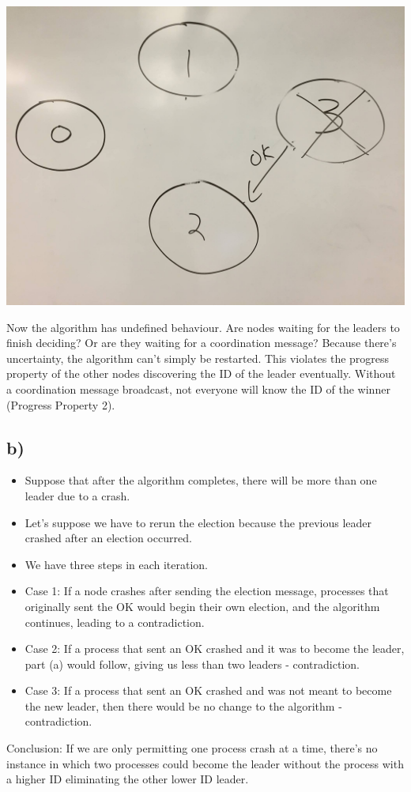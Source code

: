\documentclass[12pt]{article}
\begin{document}
\begin{center}
\includegraphics[scale=0.1]{nodes0}
\end{center}

Now the algorithm has undefined behaviour. Are nodes waiting for the leaders to finish deciding? Or are they waiting for a coordination message? Because there's uncertainty, the algorithm can't simply be restarted. This violates the progress property of the other nodes discovering the ID of the leader eventually. Without a coordination message broadcast, not everyone will know the ID of the winner (Progress Property 2).

\subsection*{b)}
\begin{itemize}
\item Suppose that after the algorithm completes, there will be more than one leader due to a crash.
\item Let's suppose we have to rerun the election because the previous leader crashed after an election occurred.
\item We have three steps in each iteration.
\item Case 1: If a node crashes after sending the election message, processes that originally sent the OK would begin their own election, and the algorithm continues, leading to a contradiction.
\item Case 2: If a process that sent an OK crashed and it was to become the leader, part (a) would follow, giving us less than two leaders - contradiction.
\item Case 3: If a process that sent an OK crashed and was not meant to become the new leader, then there would be no change to the algorithm - contradiction.
\end{itemize}
Conclusion: If we are only permitting one process crash at a time, there's no instance in which two processes could become the leader without the process with a higher ID eliminating the other lower ID leader.
\end{document}

